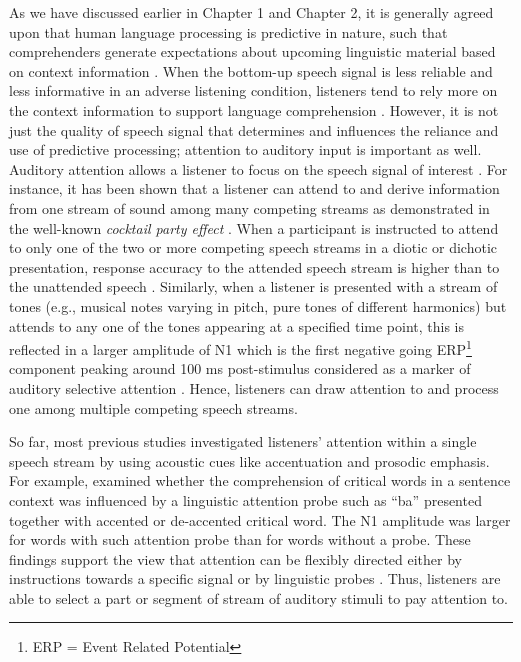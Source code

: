 \documentclass[a4paper, nobind]{templates/ociamthesis}
\begin{document}
As we have discussed earlier in Chapter 1 and Chapter 2, it is generally agreed upon that human language processing is predictive in nature, such that comprehenders generate expectations about upcoming linguistic material based on context information \autocites[for reviews, see][]{Staub2015,Kuperberg2016,Pickering2018,Nieuwland2019}.
When the bottom-up speech signal is less reliable and less informative in an adverse listening condition, listeners tend to rely more on the context information to support language comprehension \autocite{Sheldon2008b,Obleser2010,Amichetti2018}.
However, it is not just the quality of speech signal that determines and influences the reliance and use of predictive processing;
attention to auditory input is important as well.
Auditory attention allows a listener to focus on the speech signal of interest \autocites[for reviews, see][]{Fritz2007}[cf.][]{Lange2013}.
For instance, it has been shown that a listener can attend to and derive information from one stream of sound among many competing streams as demonstrated in the well-known \emph{cocktail party effect} \autocite{Cherry1953,Hafter2007}.
When a participant is instructed to attend to only one of the two or more competing speech streams in a diotic or dichotic presentation, response accuracy to the attended speech stream is higher than to the unattended speech \autocite[e.g.,][]{Toth2020}.
Similarly, when a listener is presented with a stream of tones (e.g., musical notes varying in pitch, pure tones of different harmonics) but attends to any one of the tones appearing at a specified time point, this is reflected in a larger amplitude of N1 \autocites[e.g.,][]{Lange2010}[see also,][]{Sanders2008}
which is the first negative going ERP\footnote{ERP = Event Related Potential} component peaking around 100 ms post-stimulus considered as a marker of auditory selective attention \autocite{Naatanen1987,Thornton2007}.
Hence, listeners can draw attention to and process one among multiple competing speech streams.

So far, most previous studies investigated listeners' attention within a single speech stream by using acoustic cues like accentuation and prosodic emphasis.
For example, \textcite{Li2014} examined whether the comprehension of critical words in a sentence context was influenced by a linguistic attention probe such as ``ba'' presented together with accented or de-accented critical word.
The N1 amplitude was larger for words with such attention probe than for words without a probe.
These findings support the view that attention can be flexibly directed either by instructions towards a specific signal or by linguistic probes \autocites{Li2017}[see also,][]{Brunelliere2019}.
Thus, listeners are able to select a part or segment of stream of auditory stimuli to pay attention to.
\end{document}
